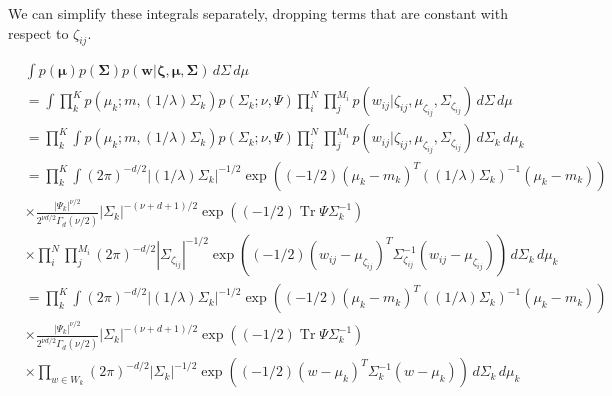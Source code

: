 \documentclass[12pt]{article}
\DeclareMathOperator{\Tr}{Tr}
\begin{document}
We can simplify these integrals separately, dropping terms that are constant with respect to $\zeta_{ij}$.

\begin{align*}
& \int p(\bm{\mu})p(\bm{\Sigma})p(\bm{w} | \bm{\zeta}, \bm{\mu}, \bm{\Sigma})\,d\Sigma \,d\mu \\
& = \int \prod^{K}_{k} p(\mu_k; m, (1/\lambda)\Sigma_k)p(\Sigma_k; \nu, \Psi) \prod^{N}_i \prod^{M_i}_j p(w_{ij} | \zeta_{ij}, \mu_{\zeta_{ij}}, \Sigma_{\zeta_{ij}}) \,d\Sigma \,d\mu \\
& = \prod^{K}_{k} \int p(\mu_k; m, (1/\lambda)\Sigma_k)p(\Sigma_k; \nu, \Psi) \prod^{N}_i \prod^{M_i}_j p(w_{ij} | \zeta_{ij}, \mu_{\zeta_{ij}}, \Sigma_{\zeta_{ij}}) \,d\Sigma_k \,d\mu_k \\
& = \prod^{K}_{k} \int (2\pi)^{-d/2} |(1/\lambda)\Sigma_k|^{-1/2} \exp{((-1/2)(\mu_k - m_k)^T((1/\lambda)\Sigma_k)^{-1}(\mu_k - m_k))} \\
& \times \frac{|\Psi_k|^{\nu/2}}{2^{\nu d/2}\Gamma_d(\nu/2)} |\Sigma_k|^{-(\nu + d + 1)/2} \exp{((-1/2) \Tr{\Psi \Sigma_k^{-1}})} \\
& \times \prod^{N}_i \prod^{M_i}_j (2\pi)^{-d/2} |\Sigma_{\zeta_{ij}}|^{-1/2} \exp{((-1/2)(w_{ij} - \mu_{\zeta_{ij}})^T\Sigma_{{\zeta_{ij}}}^{-1}(w_{ij} - \mu_{{\zeta_{ij}}}))}  \,d\Sigma_k  \,d\mu_k \\
& = \prod^{K}_{k} \int (2\pi)^{-d/2} |(1/\lambda)\Sigma_k|^{-1/2} \exp{((-1/2)(\mu_k - m_k)^T((1/\lambda)\Sigma_k)^{-1}(\mu_k - m_k))} \\
& \times \frac{|\Psi_k|^{\nu/2}}{2^{\nu d/2}\Gamma_d(\nu/2)} |\Sigma_k|^{-(\nu + d + 1)/2} \exp{((-1/2) \Tr{\Psi \Sigma_k^{-1}})} \\
& \times \prod_{w \in W_k} (2\pi)^{-d/2} |\Sigma_k|^{-1/2} \exp{((-1/2)(w - \mu_{k})^T\Sigma_{k}^{-1}(w - \mu_{k}))}  \,d\Sigma_k  \,d\mu_k \\
\end{align*}
\end{document}

